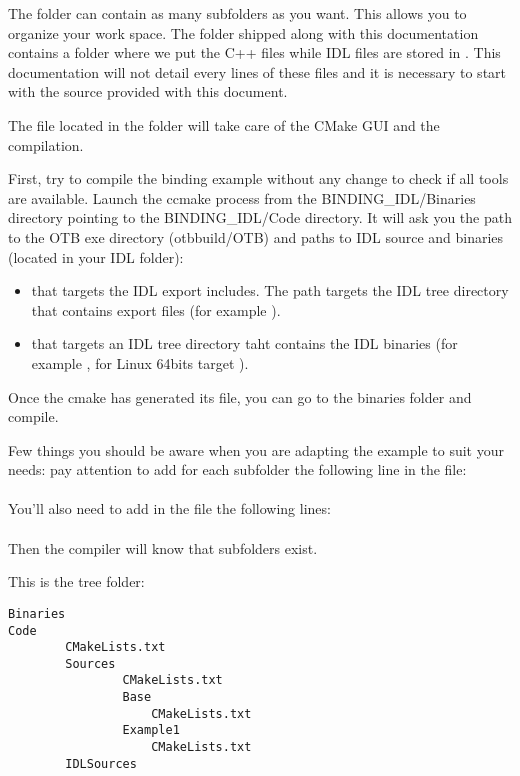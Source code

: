 The  folder can contain as many subfolders as you want. This allows you to organize your work space. The  folder shipped along with this 
documentation contains a  folder where we put the C++ files while IDL files are stored in . This documentation will not detail every lines of these files and it is necessary to start with the source provided with this document.

The  file located in the  folder will take care of the CMake GUI and the compilation.

First, try to compile the binding example without any change to check if all tools are available. Launch the ccmake process from the BINDING\_IDL/Binaries directory pointing to the BINDING\_IDL/Code directory. It will ask you the path to the OTB exe directory 
(\/otb\-build/OTB) and paths to IDL source and binaries (located in your IDL folder):

\begin{itemize}
\item {} that targets the IDL export includes. The path targets the IDL tree directory that contains export files (for example ).
\item {} that targets an IDL tree directory taht contains the IDL binaries (for example , for Linux 64bits target  ).
\end{itemize}

Once the cmake has generated its file, you can go to the binaries folder and compile.

Few things you should be aware when you are adapting the example to suit your needs: pay attention to add for each subfolder the following line in the  file:\\
\\
You'll also need to add in the  file the following lines:
\\
\\


Then the compiler will know that subfolders exist.
 
This is the tree folder:
\begin{verbatim}
Binaries
Code
        CMakeLists.txt
        Sources
                CMakeLists.txt
                Base
                    CMakeLists.txt
                Example1
                    CMakeLists.txt
        IDLSources
\end{verbatim}
 
